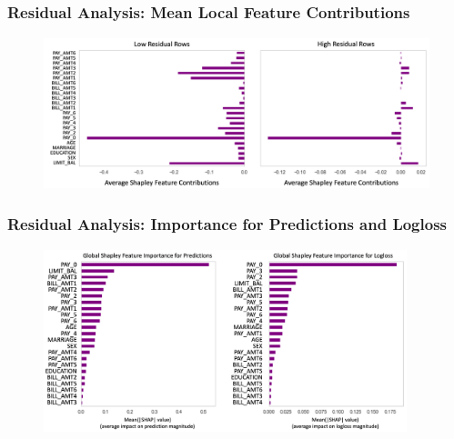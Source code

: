 \documentclass[11pt,
               aspectratio=43,
               hyperref={colorlinks}
               ]{beamer}
\begin{document}
			\begin{frame}
		
				\frametitle{\textbf{Residual Analysis}: Mean Local Feature Contributions}
		
				\begin{figure}[htb]
					\begin{center}
						\includegraphics[height=125pt]{img/global_high_low.png}
					\end{center}
				\end{figure}	
		
			\end{frame}

			\begin{frame}
		
				\frametitle{\large{\textbf{Residual Analysis}: Importance for Predictions and Logloss}}
		
				\begin{figure}[htb]
					\begin{center}
						\includegraphics[height=150pt]{img/global_pred_loss.png}
					\end{center}
				\end{figure}	
		
			\end{frame}
\end{document}
